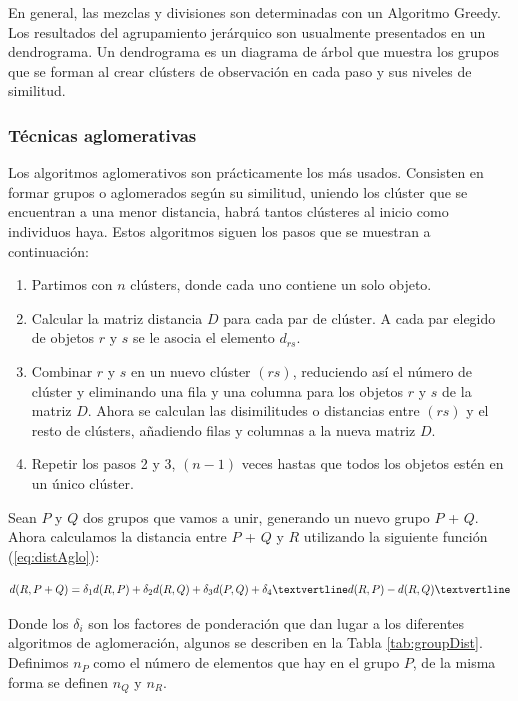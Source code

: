 \documentclass[a4paper, 20pt]{article}
\begin{document}
En general, las mezclas y divisiones son determinadas con un Algoritmo Greedy. Los resultados del agrupamiento jerárquico son usualmente presentados en un dendrograma. Un dendrograma es un diagrama de árbol que muestra los grupos que se forman al crear clústers de observación en cada paso y sus niveles de similitud.


\subsubsection{Técnicas aglomerativas}
Los algoritmos aglomerativos son prácticamente los más usados. Consisten en formar grupos o aglomerados según su similitud, uniendo los clúster que se encuentran a una menor distancia, habrá tantos clústeres al inicio como individuos haya. Estos algoritmos siguen los pasos que se muestran a continuación:

\begin{enumerate}
	\item Partimos con $n$ clústers, donde cada uno contiene un solo objeto.
	\item Calcular la matriz distancia $D$ para cada par de clúster. A cada par elegido de objetos $r$ y $s$ se le asocia el elemento $d_{rs}$.
	\item Combinar $r$ y $s$ en un nuevo clúster $(rs)$, reduciendo así el número de clúster y eliminando una fila y una columna para los objetos $r$ y $s$ de la matriz $D$. Ahora se calculan las disimilitudes o distancias entre $(rs)$ y el resto de clústers, añadiendo filas y columnas a la nueva matriz $D$.
	\item Repetir los pasos 2 y 3, $(n-1)$ veces hastas que todos los objetos estén en un único clúster.
\end{enumerate}

Sean $P$ y $Q$ dos grupos que vamos a unir, generando un nuevo grupo $P$ + $Q$. Ahora calculamos la distancia entre $P$ + $Q$ y $R$ utilizando la siguiente función (\ref{eq:distAglo}):

\begin{equation}\label{eq:distAglo}
	d(R, P+Q) = \delta_1 d(R,P) + \delta_2 d(R,Q) + \delta_3 d(P,Q) + \delta_4 \textvertline d(R,P) - d(R,Q) \textvertline
\end{equation}

Donde los $\delta_i$ son los factores de ponderación que dan lugar a los diferentes algoritmos de aglomeración, algunos se describen en la Tabla \ref{tab:groupDist}. Definimos $n_P$ como el número de elementos que hay en el grupo $P$, de la misma forma se definen $n_Q$ y $n_R$.
\end{document}
